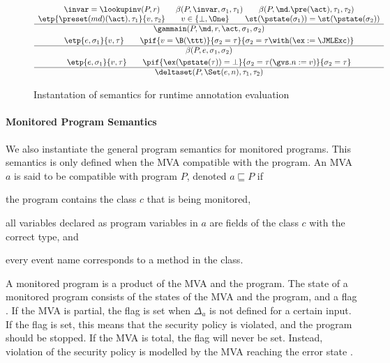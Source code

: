 \begin{figure}[t]
\[
\begin{array}[t]{c}
\invar = \lookupinv(P, r) \qquad 
\beta(P, \invar, \sigma_1, \tau_1) \qquad
\beta(P, \md.\pre(\act), \tau_1, \tau_2) \\
\etp{\preset(md)(\act), \tau_1}{v,\tau_2} \qquad v\in\{\bot,\One\} \qquad
\st(\pstate(\sigma_1)) = \st(\pstate(\sigma_2))\\
\hline
\gammain(P, \md, r, \act, \sigma_1, \sigma_2) 
\smallskip\\


\etp{e, \sigma_1}{v, \tau} \qquad
\pif{v = \B(\ttt)}{\sigma_2 = \tau}{\sigma_2 = \tau \with (\ex := \JMLExc)}\\
\hline
\beta(P, e, \sigma_1, \sigma_2) 

\smallskip\\

\etp{e, \sigma_1}{v, \tau} \qquad
\pif{\ex(\pstate(\tau)) = \bot}{\sigma_2 = \tau (\gvs.n :=
v)}{\sigma_2 = \tau}\\
\hline
\deltaset(P, \Set(e, n), \tau_1, \tau_2) 
\end{array}
\]
\caption{Instantation of semantics for runtime annotation evaluation}
\label{FigAnnotatedSem}
\end{figure}

\paragraph{Monitored Program Semantics}
We also instantiate the general program semantics for monitored
programs. This semantics is only defined when the MVA compatible with
the program. An MVA \(a\) is said to be compatible with program \(P\),
denoted \(a \sqsubseteq P\) if
\begin{inparaenum}
\item the program contains the class \(c\) that is being monitored, 
\item all variables declared as program variables in
\(a\) are fields of the class \(c\) with the correct type, and 
\item every event name corresponds to a method in the class. 
\end{inparaenum}
A monitored program is a product of the MVA and the program. The state
of a monitored program consists of the states of the MVA and the
program, and a flag \stuck. If the MVA is partial, the flag
\stuck is set when \(\Delta_a\) is not defined for a
certain input. If the flag is set, this means that the security policy
is violated, and the program should be stopped. If the MVA is total,
the \stuck flag will never be set. Instead, violation of the security
policy is modelled by the MVA reaching the error state \halted.


